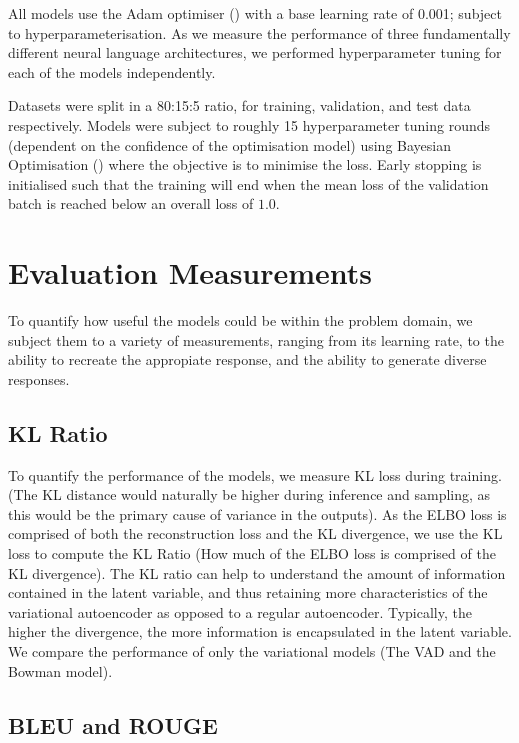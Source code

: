 \documentclass[12pt,twoside]{report}
\begin{document}
All models use the Adam optimiser (\cite{kingma_adam:_2014}) with a base learning rate of 0.001; subject to hyperparameterisation. As we measure the performance of three fundamentally different neural language architectures, we performed hyperparameter tuning for each of the models independently.

Datasets were split in a 80:15:5 ratio, for training, validation, and test data respectively. Models were subject to roughly 15 hyperparameter tuning rounds (dependent on the confidence of the optimisation model) using Bayesian Optimisation (\cite{gpyopt_authors_gpyopt:_2016}) where the objective is to minimise the loss. Early stopping is initialised such that the training will end when the mean loss of the validation batch is reached below an overall loss of $1.0$. 

\section{Evaluation Measurements}

To quantify how useful the models could be within the problem domain, we subject them to a variety of measurements, ranging from its learning rate, to the ability to recreate the appropiate response, and the ability to generate diverse responses.

\subsection{KL Ratio}

To quantify the performance of the models, we measure KL loss during training. (The KL distance would naturally be higher during inference and sampling, as this would be the primary cause of variance in the outputs). As the ELBO loss is comprised of both the reconstruction loss and the KL divergence, we use the KL loss to compute the KL Ratio (How much of the ELBO loss is comprised of the KL divergence). The KL ratio can help to understand the amount of information contained in the latent variable, and thus retaining more characteristics of the variational autoencoder as opposed to a regular autoencoder.  Typically, the higher the divergence, the more information is encapsulated in the latent variable. We compare the performance of only the variational models (The VAD and the Bowman model).

\subsection{BLEU and ROUGE}
\end{document}
